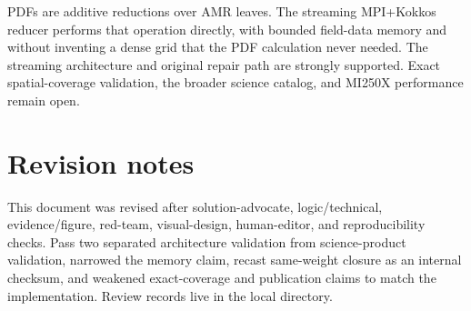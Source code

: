 \documentclass[11pt]{article}
\begin{document}
\bottomline PDFs are additive reductions over AMR leaves. The streaming
MPI+Kokkos reducer performs that operation directly, with bounded field-data
memory and
without inventing a dense grid that the PDF calculation never needed. The
streaming architecture and original repair path are strongly supported. Exact
spatial-coverage validation, the broader science catalog, and MI250X
performance remain open.

\appendix
\section{Revision notes}
This document was revised after solution-advocate, logic/technical,
evidence/figure, red-team, visual-design, human-editor, and reproducibility
checks. Pass two separated architecture validation from science-product
validation, narrowed the memory claim, recast same-weight closure as an
internal checksum, and weakened exact-coverage and publication claims to match
the implementation. Review records live in the local 
directory.
\end{document}
